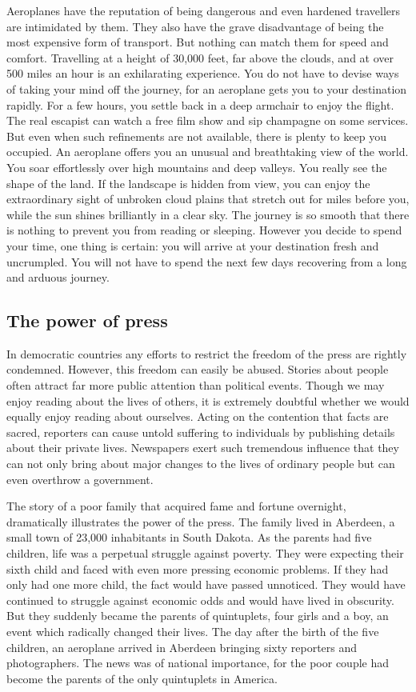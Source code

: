 \documentclass[11pt]{article}
\begin{document}
Aeroplanes have the reputation of being dangerous and even hardened travellers are intimidated by them. They also have the grave disadvantage of being the most expensive form of transport. But nothing can match them for speed and comfort. Travelling at a height of 30,000 feet, far above the clouds, and at over 500 miles an hour is an exhilarating experience. You do not have to devise ways of taking your mind off the journey, for an aeroplane gets you to your destination rapidly. For a few hours, you settle back in a deep armchair to enjoy the flight. The real escapist can watch a free film show and sip champagne on some services. But even when such refinements are not available, there is plenty to keep you occupied. An aeroplane offers you an unusual and breathtaking view of the world. You soar effortlessly over high mountains and deep valleys. You really see the shape of the land. If the landscape is hidden from view, you can enjoy the extraordinary sight of unbroken cloud plains that stretch out for miles before you, while the sun shines brilliantly in a clear sky. The journey is so smooth that there is nothing to prevent you from reading or sleeping. However you decide to spend your time, one thing is certain: you will arrive at your destination fresh and uncrumpled. You will not have to spend the next few days recovering from a long and arduous journey. 
\subsection{The power of press}
\label{sec-1-45}

In democratic countries any efforts to restrict the freedom of the press are rightly condemned. However, this freedom can easily be abused. Stories about people often attract far more public attention than political events. Though we may enjoy reading about the lives of others, it is extremely doubtful whether we would equally enjoy reading about ourselves. Acting on the contention that facts are sacred, reporters can cause untold suffering to individuals by publishing details about their private lives. Newspapers exert such tremendous influence that they can not only bring about major changes to the lives of ordinary people but can even overthrow a government. 

The story of a poor family that acquired fame and fortune overnight, dramatically illustrates the power of the press. The family lived in Aberdeen, a small town of 23,000 inhabitants in South Dakota. As the parents had five children, life was a perpetual struggle against poverty. They were expecting their sixth child and faced with even more pressing economic problems. If they had only had one more child, the fact would have passed unnoticed. They would have continued to struggle against economic odds and would have lived in obscurity. But they suddenly became the parents of quintuplets, four girls and a boy, an event which radically changed their lives. The day after the birth of the five children, an aeroplane arrived in Aberdeen bringing sixty reporters and photographers. The news was of national importance, for the poor couple had become the parents of the only quintuplets in America. 
\end{document}

